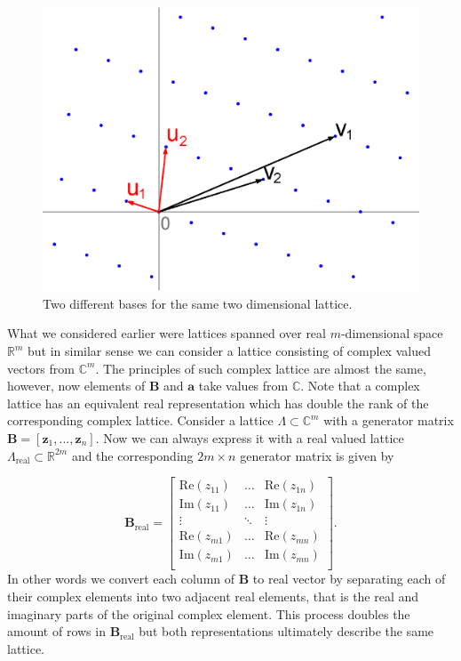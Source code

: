 \documentclass[english,12pt,a4paper,pdftex,sci,utf8]{aaltothesis}
\begin{document}
\begin{figure}[ht]
  \centering
  \includegraphics[width=0.8\linewidth]{Lattice-reduction}
  \caption{Two different bases for the same two dimensional lattice.}
  \label{fig:bases}
\end{figure}

\par What we considered earlier were lattices spanned over real $m$-dimensional space $\mathbb{R}^m$ but in similar sense we can consider a lattice consisting of complex valued vectors from $\mathbb{C}^m$. The principles of such complex lattice are almost the same, however, now elements of $\mathbf{B}$ and $\mathbf{a}$ take values from $\mathbb{C}$. Note that a complex lattice has an equivalent real representation which has double the rank of the corresponding complex lattice. Consider a lattice $\Lambda \subset \mathbb{C}^m$ with a generator matrix $\mathbf{B} = [\mathbf{z}_1, ... , \mathbf{z}_n]$. Now we can always express it with a real valued lattice $\Lambda_{\text{real}} \subset \mathbb{R}^{2m}$ and the corresponding $2m \times n$ generator matrix is given by

\begin{equation}
\mathbf{B}_{\text{real}} =
\begin{bmatrix} 
\text{Re}(z_{11}) & \dots  & \text{Re}(z_{1n}) \\
\text{Im}(z_{11}) & \dots  & \text{Im}(z_{1n}) \\
\vdots            & \ddots & \vdots            \\
\text{Re}(z_{m1}) & \dots  & \text{Re}(z_{mn}) \\
\text{Im}(z_{m1}) & \dots  & \text{Im}(z_{mn}) \\
\end{bmatrix}.
\label{eq:complex}
\end{equation}
In other words we convert each column of $\mathbf{B}$ to real vector by separating each of their complex elements into two adjacent real elements, that is the real and imaginary parts of the original complex element. This process doubles the amount of rows in $\mathbf{B}_{\text{real}}$ but both representations ultimately describe the same lattice. \cite{conway}
\end{document}
